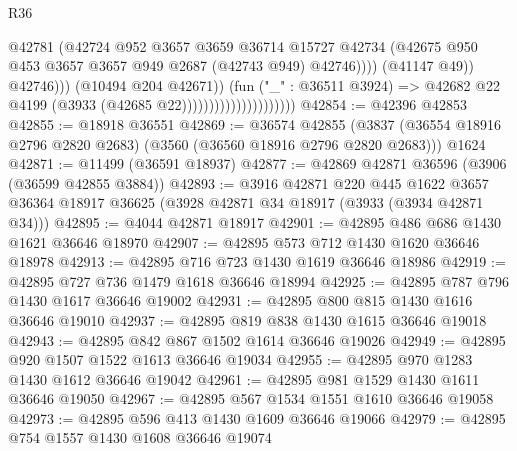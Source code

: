\begin{lexlean}{R36}
\begin{coremodule}
                                                      @42781
                                                      (@42724
                                                        @952
                                                        @3657
                                                        @3659
                                                        @36714
                                                        @15727
                                                        @42734
                                                        (@42675
                                                          @950
                                                          @453
                                                          @3657
                                                          @3657
                                                          @949
                                                          @2687
                                                          (@42743 @949)
                                                          @42746))))
                                                  (@41147 @49))
                                                @42746)))
                                          (@10494 @204 @42671))
                                        (fun ("_" : @36511 @3924) =>
                                        @42682 @22 @4199 (@3933 (@42685 @22)))))))))))))))))))))
@42854 := @42396 @42853
@42855 := @18918 @36551
@42869 := @36574
    @42855
    (@3837 (@36554 @18916 @2796 @2820 @2683) (@3560 (@36560 @18916 @2796 @2820 @2683)))
    @1624
@42871 := @11499 (@36591 @18937)
@42877 := @42869 @42871 @36596 (@3906 (@36599 @42855 @3884))
@42893 := @3916
    @42871
    @220
    @445
    @1622
    @3657
    @36364
    @18917
    @36625
    (@3928 @42871 @34 @18917 (@3933 (@3934 @42871 @34)))
@42895 := @4044 @42871 @18917
@42901 := @42895 @486 @686 @1430 @1621 @36646 @18970
@42907 := @42895 @573 @712 @1430 @1620 @36646 @18978
@42913 := @42895 @716 @723 @1430 @1619 @36646 @18986
@42919 := @42895 @727 @736 @1479 @1618 @36646 @18994
@42925 := @42895 @787 @796 @1430 @1617 @36646 @19002
@42931 := @42895 @800 @815 @1430 @1616 @36646 @19010
@42937 := @42895 @819 @838 @1430 @1615 @36646 @19018
@42943 := @42895 @842 @867 @1502 @1614 @36646 @19026
@42949 := @42895 @920 @1507 @1522 @1613 @36646 @19034
@42955 := @42895 @970 @1283 @1430 @1612 @36646 @19042
@42961 := @42895 @981 @1529 @1430 @1611 @36646 @19050
@42967 := @42895 @567 @1534 @1551 @1610 @36646 @19058
@42973 := @42895 @596 @413 @1430 @1609 @36646 @19066
@42979 := @42895 @754 @1557 @1430 @1608 @36646 @19074

\end{coremodule}
\end{lexlean}
